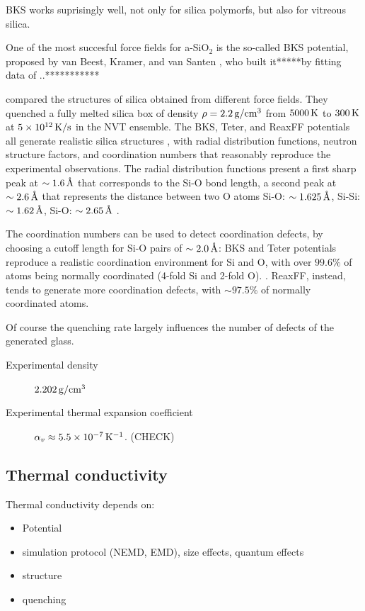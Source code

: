 BKS works suprisingly well, not only for silica polymorfs, but also for vitreous silica.

One of the most succesful force fields for a-SiO$_2$ is the so-called BKS potential, proposed by van Beest, Kramer, and van Santen \cite{Silica-BKS-1990}, who built it*****by fitting \abinitio data of ..***********

\citet{Tian2017} compared the structures of silica obtained from different force fields. They quenched a fully melted silica box of density $\rho=2.2\,\mathrm{g/cm^3}$ from $5000\,\mathrm{K}$ to $300\,\mathrm{K}$ at $5\times 10^{12}\,\mathrm{K/s}$ in the NVT ensemble. 
The BKS, Teter, and ReaxFF potentials all generate realistic silica structures \cite{Vollmayr1996,Yu2016,Yuan2001}, with radial distribution functions, neutron structure factors, and coordination numbers that reasonably reproduce the experimental observations.
The radial distribution functions present a first sharp peak at $\sim 1.6\,\mathrm{{\mbox{\AA}}}$ that corresponds to the Si-O bond length, a second peak at $\sim 2.6\,\mathrm{{\mbox{\AA}}}$ that represents the distance between two O atoms
Si-O: $\sim 1.625\,\mathrm{{\mbox{\AA}}}$, Si-Si: $\sim 1.62\,\mathrm{{\mbox{\AA}}}$, Si-O: $\sim 2.65\,\mathrm{{\mbox{\AA}}}$ \cite{Bhattarai2016}.

The coordination numbers can be used to detect coordination defects, by choosing a cutoff length for Si-O pairs of $\sim 2.0\,\mathrm{{\mbox{\AA}}}$: BKS and Teter potentials reproduce a realistic coordination environment for Si and O, with over $99.6\%$ of atoms being normally coordinated (4-fold Si and 2-fold O). . ReaxFF, instead, tends to generate more coordination defects, with $\sim 97.5\%$ of normally coordinated atoms.

Of course the quenching rate largely influences the number of defects of the generated glass. 

\begin{description}
    \item[Experimental density] $2.202\,\mathrm{g/cm^3}$
    \item[Experimental thermal expansion coefficient] $\alpha_v \approx 5.5\times 10^{-7}\,\mathrm{K^{-1}}$. (CHECK)
\end{description}


\subsection{Thermal conductivity}
Thermal conductivity depends on:
\begin{itemize}
    \item Potential
    \item simulation protocol (NEMD, EMD), size effects, quantum effects
    \item structure
    \item quenching
\end{itemize}


